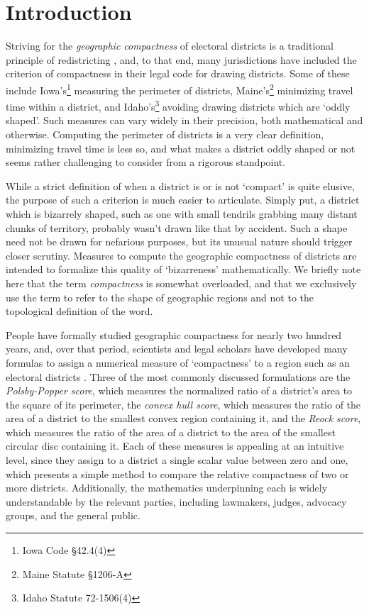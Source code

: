 \section{Introduction}
Striving for the \textit{geographic compactness} of electoral
districts is a traditional principle of redistricting \cite{altman_1998}, and, to that
end, many jurisdictions have included the criterion of compactness in
their legal code for drawing districts.  Some of these include Iowa's\footnote{Iowa Code \S42.4(4)} measuring the perimeter of districts, Maine's\footnote{Maine Statute \S1206-A} minimizing travel time within a district, and Idaho's\footnote{Idaho Statute 72-1506(4)} avoiding 
drawing districts which are \enquote*{oddly shaped}.  Such measures can vary widely in their 
precision, both mathematical and otherwise.  Computing the perimeter of districts is a very clear definition, minimizing travel time is less so, and what makes a district oddly shaped or not seems rather challenging to consider from a rigorous standpoint. 

While a strict definition of when a district is or is not \enquote*{compact} is quite elusive, the purpose of such a criterion is much easier to articulate.  Simply put, a district which is bizarrely shaped, such as one with small tendrils grabbing many distant chunks of territory,
probably wasn't drawn like that by accident. Such a shape need not be drawn for nefarious
purposes, but its unusual nature should trigger closer scrutiny.  Measures to compute the
geographic compactness of districts are intended to formalize this quality of \enquote*{bizarreness}
mathematically.  We briefly note here that the term \textit{compactness} is somewhat 
overloaded, and that we exclusively use the term to refer to the shape of geographic 
regions and not to the topological definition of the word.


People have formally studied geographic compactness for nearly two hundred years, and, over that period, scientists and legal scholars have developed many formulas to assign a numerical measure of \enquote*{compactness} to a region such as an electoral districts \cite{young_compactness}.
 Three of the most commonly discussed formulations are the \textit{Polsby-Popper score}, which
measures the normalized ratio of a district's area to the square of its
perimeter, the \textit{convex hull score}, which measures the ratio
of the area of a district to the smallest convex region containing it,
and the \textit{Reock score}, which measures the ratio of the area of
a district to the area of the smallest circular disc containing it.  Each of these
measures is appealing at an intuitive level, since they assign to
a district a single scalar value between zero and one, which presents a simple 
method to compare the relative compactness of two or more districts. 
Additionally, the
mathematics underpinning each is widely understandable by the relevant
parties, including lawmakers, judges, advocacy groups, and the general
public.  

